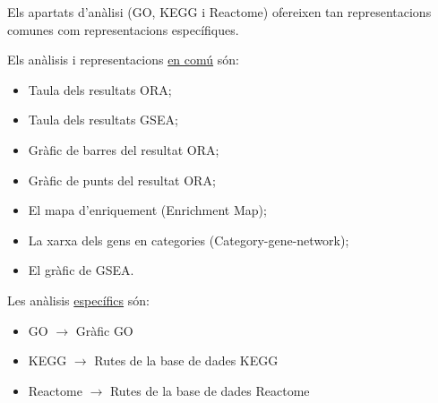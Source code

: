 \documentclass[]{article}
\begin{document}
Els apartats d'anàlisi (GO, KEGG i Reactome) ofereixen tan representacions comunes com representacions específiques. 

Els anàlisis i representacions \underline{en comú} són:

\begin{itemize}
\item Taula dels resultats ORA;
\item Taula dels resultats GSEA;
\item Gràfic de barres del resultat ORA;
\item Gràfic de punts del resultat ORA;
\item El mapa d'enriquement (Enrichment Map);
\item La xarxa dels gens en categories (Category-gene-network);
\item El gràfic de GSEA.
\end{itemize} 

Les anàlisis \underline{específics} són:

\begin{itemize}
\item GO $\rightarrow$ Gràfic GO 
\item KEGG $\rightarrow$ Rutes de la base de dades KEGG
\item Reactome $\rightarrow$ Rutes de la base de dades Reactome
\end{itemize}
\end{document}

